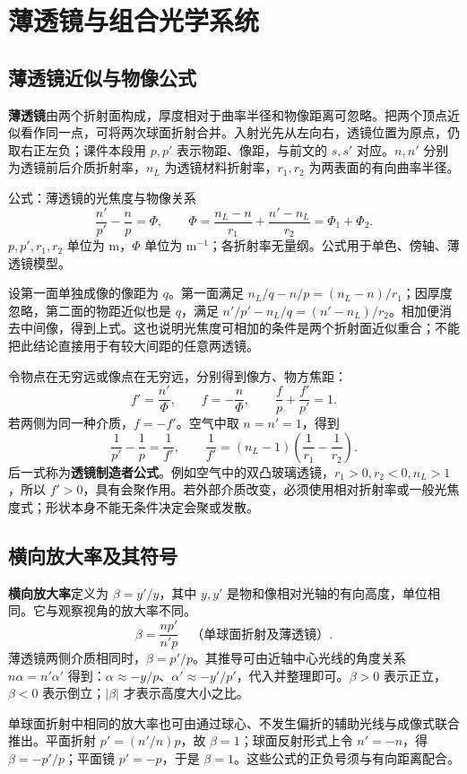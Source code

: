 \documentclass[UTF8,fontset=none,zihao=-4,a4paper]{ctexart}
\newcommand{\chapterpage}[1]{\clearpage\section{#1}}
\newcommand{\term}[1]{\textbf{#1}}
\begin{document}
\chapterpage{薄透镜与组合光学系统}
\subsection{薄透镜近似与物像公式}
\term{薄透镜}由两个折射面构成，厚度相对于曲率半径和物像距离可忽略。把两个顶点近似看作同一点，可将两次球面折射合并。入射光先从左向右，透镜位置为原点，仍取右正左负；课件本段用 $p,p'$ 表示物距、像距，与前文的 $s,s'$ 对应。$n,n'$ 分别为透镜前后介质折射率，$n_L$ 为透镜材料折射率，$r_1,r_2$ 为两表面的有向曲率半径。
\begin{infobox}{公式：薄透镜的光焦度与物像关系}
\[
 \frac{n'}{p'}-\frac n p=\Phi,\qquad
 \Phi=\frac{n_L-n}{r_1}+\frac{n'-n_L}{r_2}=\Phi_1+\Phi_2.
\]
$p,p',r_1,r_2$ 单位为 m，$\Phi$ 单位为 $\mathrm{m^{-1}}$；各折射率无量纲。公式用于单色、傍轴、薄透镜模型。
\end{infobox}
设第一面单独成像的像距为 $q$。第一面满足 $n_L/q-n/p=(n_L-n)/r_1$；因厚度忽略，第二面的物距近似也是 $q$，满足 $n'/p'-n_L/q=(n'-n_L)/r_2$。相加便消去中间像，得到上式。这也说明光焦度可相加的条件是两个折射面近似重合；不能把此结论直接用于有较大间距的任意两透镜。

令物点在无穷远或像点在无穷远，分别得到像方、物方焦距：
\[
 f'=\frac{n'}\Phi,\qquad f=-\frac n\Phi,
 \qquad \frac f p+\frac{f'}{p'}=1.
\]
若两侧为同一种介质，$f=-f'$。空气中取 $n=n'=1$，得到
\[
 \frac1{p'}-\frac1p=\frac1{f'},\qquad
 \frac1{f'}=(n_L-1)\left(\frac1{r_1}-\frac1{r_2}\right).
\]
后一式称为\term{透镜制造者公式}。例如空气中的双凸玻璃透镜，$r_1>0,r_2<0,n_L>1$，所以 $f'>0$，具有会聚作用。若外部介质改变，必须使用相对折射率或一般光焦度式；形状本身不能无条件决定会聚或发散。

\subsection{横向放大率及其符号}
\term{横向放大率}定义为 $\beta=y'/y$，其中 $y,y'$ 是物和像相对光轴的有向高度，单位相同。它与观察视角的放大率不同。
\[
 \beta=\frac{np'}{n'p}\quad\text{（单球面折射及薄透镜）}.
\]
薄透镜两侧介质相同时，$\beta=p'/p$。其推导可由近轴中心光线的角度关系 $n\alpha=n'\alpha'$ 得到：$\alpha\approx-y/p$、$\alpha'\approx-y'/p'$，代入并整理即可。$\beta>0$ 表示正立，$\beta<0$ 表示倒立；$|\beta|$ 才表示高度大小之比。

单球面折射中相同的放大率也可由通过球心、不发生偏折的辅助光线与成像式联合推出。平面折射 $p'=(n'/n)p$，故 $\beta=1$；球面反射形式上令 $n'=-n$，得 $\beta=-p'/p$；平面镜 $p'=-p$，于是 $\beta=1$。这些公式的正负号须与有向距离配合。
\end{document}
